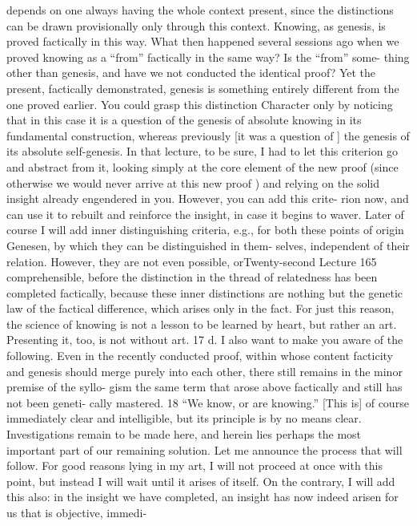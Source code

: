 depends on one always having the whole context present, since the distinctions
can be drawn provisionally only through this context. Knowing, as genesis, is
proved factically in this way. What then happened several sessions ago when
we proved knowing as a “from” factically in the same way? Is the “from” some-
thing other than genesis, and have we not conducted the identical proof? Yet
the present, factically demonstrated, genesis is something entirely different
from the one proved earlier. You could grasp this distinction {Character} only
by noticing that in this case it is a question of the genesis of absolute knowing
in its fundamental construction, whereas previously [it was a question of ] the
genesis of its absolute self-genesis. In that lecture, to be sure, I had to let this
criterion go and abstract from it, looking simply at the core element of the new
proof (since otherwise we would never arrive at this new proof ) and relying on
the solid insight already engendered in you. However, you can add this crite-
rion now, and can use it to rebuilt and reinforce the insight, in case it begins to
waver. Later of course I will add inner distinguishing criteria, e.g., for both
these points of origin {Genesen}, by which they can be distinguished in them-
selves, independent of their relation. However, they are not even possible, orTwenty-second Lecture
165
comprehensible, before the distinction in the thread of relatedness has been
completed factically, because these inner distinctions are nothing but the
genetic law of the factical difference, which arises only in the fact. For just this
reason, the science of knowing is not a lesson to be learned by heart, but rather
an art. Presenting it, too, is not without art. 17
d. I also want to make you aware of the following. Even in the recently
conducted proof, within whose content facticity and genesis should merge
purely into each other, there still remains in the minor premise of the syllo-
gism the same term that arose above factically and still has not been geneti-
cally mastered. 18 “We know, or are knowing.” [This is] of course immediately
clear and intelligible, but its principle is by no means clear. Investigations
remain to be made here, and herein lies perhaps the most important part of
our remaining solution.
Let me announce the process that will follow. For good reasons lying in
my art, I will not proceed at once with this point, but instead I will wait until
it arises of itself. On the contrary, I will add this also: in the insight we have
completed, an insight has now indeed arisen for us that is objective, immedi-
